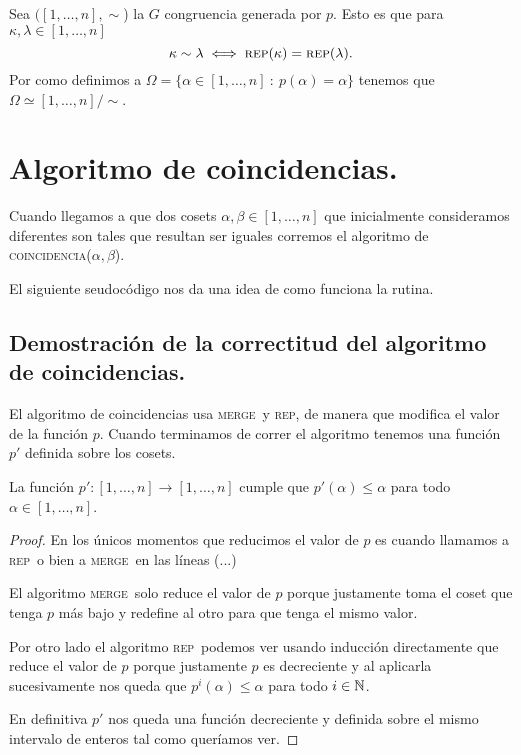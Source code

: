 \documentclass[tesis.tex]{subfiles}
\newcommand{\rep}{\textsc{rep}}
\newcommand{\coin}{\textsc{coincidencia}}
\newcommand{\mer}{\textsc{merge}}
\begin{document}
Sea $([1,\dots,n], \sim$) la $G$ congruencia generada por $p$. 
Esto es que para $\kappa, \lambda \in [1,\dots,n]$
\[
\kappa \sim \lambda \iff \rep(\kappa) = \rep (\lambda).
\] 
Por como definimos a $\Omega = \{  \alpha \in [1,\dots,n] \ : \ p(\alpha) = \alpha \}$ tenemos que $\Omega \simeq [1, \dots, n] / \sim$.

\section{Algoritmo de coincidencias.}

Cuando llegamos a que dos cosets $\alpha, \beta \in [1, \dots, n]$ que inicialmente consideramos diferentes  son tales que resultan ser iguales corremos el algoritmo de \coin($\alpha, \beta$).

El siguiente seudocódigo nos da una idea de como funciona la rutina.








\subsection{Demostración de la correctitud del algoritmo de coincidencias.}

El algoritmo de coincidencias usa \mer \ y \rep, de manera que modifica el valor de la función $p$.
Cuando terminamos de correr el algoritmo tenemos una función $p'$ definida sobre los cosets.

\begin{lema}
	La función $p':[1,\dots,n] \to [1,\dots,n]$ cumple que $p'(\alpha) \le \alpha$ para todo $\alpha \in [1,\dots,n]$. 
\end{lema}
\begin{proof}
	En los únicos momentos que reducimos el valor de $p$ es cuando llamamos a \rep \  o bien a \mer \ en las líneas (...)
	
	El algoritmo \mer \  solo reduce el valor de $p$ porque justamente toma el coset que tenga $p$ más bajo y redefine al otro para que tenga el mismo valor.
	
	Por otro lado el algoritmo \rep \ podemos ver usando inducción directamente que reduce el valor de $p$ porque justamente $p$ es decreciente y al aplicarla sucesivamente nos queda que $p^i(\alpha) \le \alpha$ para todo $i \in \mathbb{N}$.
	
	En definitiva $p'$ nos queda una función decreciente y definida sobre el mismo intervalo de enteros tal como queríamos ver.	
\end{proof}
\end{document}
